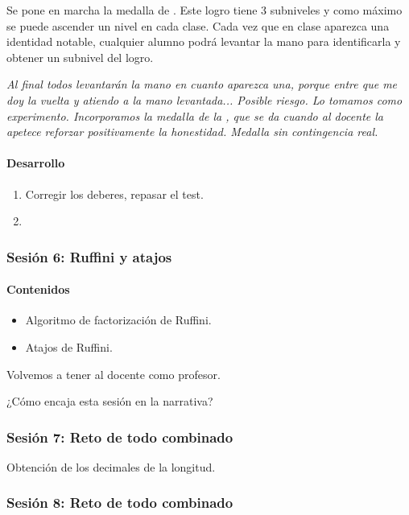 Se pone en marcha la medalla de .
%
Este logro tiene 3 subniveles y como máximo se puede ascender un nivel en cada clase.
%
Cada vez que en clase aparezca una identidad notable, cualquier alumno podrá levantar la mano para identificarla y obtener un subnivel del logro.

\textit{Al final todos levantarán la mano en cuanto aparezca una, porque entre que me doy la vuelta y atiendo a la mano levantada... Posible riesgo. Lo tomamos como experimento.
%
Incorporamos la medalla de la , que se da cuando al docente la apetece reforzar positivamente la honestidad.
%
Medalla sin contingencia real.
}


\paragraph{Desarrollo}
\begin{enumerate}
	\item Corregir los deberes, repasar el test.
	\item 
\end{enumerate}

\subsubsection{Sesión 6: Ruffini y atajos}

\paragraph{Contenidos}
\begin{itemize}
	\item Algoritmo de factorización de Ruffini.
	\item Atajos de Ruffini.
\end{itemize}

Volvemos a tener al docente como profesor.

¿Cómo encaja esta sesión en la narrativa?

\subsubsection{Sesión 7: Reto de todo combinado}

Obtención de los decimales de la longitud.

\subsubsection{Sesión 8: Reto de todo combinado}

